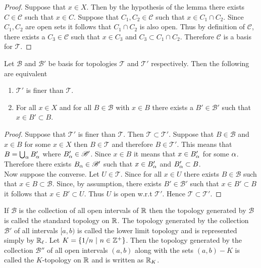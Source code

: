 \begin{proof}
  Suppose that $x\in X$. Then by the hypothesis of the lemma there exists $C\in \mathscr{C}$ such that $x\in C$. Suppose that $C_1,C_2\in \mathscr{C}$ such that $x\in C_1\cap C_2$. Since $C_1, C_2$ are open sets it follows that $C_1\cap C_2$ is also open. Thus by definition of $ \mathscr{C}$, there exists a $C_3\in \mathscr{C}$ such that $x\in C_3$ and $C_3\subset C_1 \cap C_2$. Therefore $ \mathscr{C}$ is a basis for $ \mathscr{T}$.
\end{proof}
\begin{lemma}
  Let $ \mathscr{B}$ and $ \mathscr{B}'$ be basis for topologies $ \mathscr{T}$ and $ \mathscr{T}'$ respectively. Then the following are equivalent
  \begin{enumerate}
    \item $\mathscr{T}'$ is finer than $ \mathscr{T}$.
    \item For all $x\in X$ and for all $B\in \mathscr{B}$ with $x\in B$ there exists a $B'\in \mathscr{B}'$ such that $x\in B' \subset B$.
  \end{enumerate}
\end{lemma}
\begin{proof}
  Suppose that $ \mathscr{T}'$ is finer than $ \mathscr{T}$. Then $ \mathscr{T} \subset \mathscr{T}'$. Suppose that $B\in \mathscr{B}$ and $x\in B$ for some $x\in X$ then $B\in \mathscr{T}$ and therefore $B\in \mathscr{T}'$. This means that $B = \bigcup_{\alpha}B'_\alpha$ where $B'_\alpha\in \mathscr{B}'$. Since $x\in B$ it means that $x\in B'_\alpha$ for some $\alpha$. Therefore there exists $B_\alpha\in \mathscr{B}'$ such that $x\in B'_\alpha$ and $B'_\alpha \subset B$.\\

  Now suppose the converse. Let $U\in \mathscr{T}$. Since for all $x\in U$ there exists $B\in \mathscr{B}$ such that $x\in B \subset \mathscr{B}$. Since, by assumption, there exists $B'\in \mathscr{B}'$ such that $x\in B' \subset B$ it follows that $x\in B' \subset U$. Thus $U$ is open w.r.t $ \mathscr{T}'$. Hence $ \mathscr{T} \subset \mathscr{T}'$.
\end{proof}
\begin{definition}
  If $ \mathscr{B}$ is the collection of all open intervals of $\mathbb{R}$ then the topology generated by $ \mathscr{B}$ is called the standard topology on $\mathbb{R}$. The topology generated by the collection $ \mathscr{B}'$ of all intervals $[a,b)$ is called the lower limit topology and is represented simply by $\mathbb{R}_\ell$. Let $K = \{1/n\ |\ n\in \mathbb{Z}^+\}$. Then the topology generated by the collection $ \mathscr{B}''$ of all open intervals $(a,b)$ along with the sets $(a,b) - K$ is called the $K$-topology on $\mathbb{R}$ and is written as $\mathbb{R}_K$.
\end{definition}
